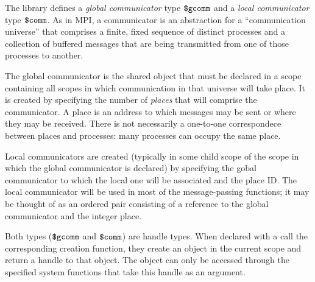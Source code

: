 The library defines a \emph{global communicator} type $\mbox{\texttt{\${}gcomm}}$ and a
\emph{local communicator} type $\mbox{\texttt{\${}comm}}$. As in MPI, a communicator is
an abstraction for a ``communication universe'' that comprises a
finite, fixed sequence of distinct processes and a collection of
buffered messages that are being transmitted from one of those
processes to another.

The global communicator is the shared object that must be declared in
a scope containing all scopes in which communication in that universe
will take place. It is created by specifying the number of
\emph{places} that will comprise the communicator. A place is an
address to which messages may be sent or where they may be received.
There is not necessarily a one-to-one correspondece between places and
processes: many processes can occupy the same place.

Local communicators are created (typically in some child scope of the
scope in which the global communicator is declared) by specifying the
gobal communicator to which the local one will be associated and the
place ID. The local communicator will be used in most of the
message-passing functions; it may be thought of as an ordered pair
consisting of a reference to the global communicator and the integer
place.

Both types ($\mbox{\texttt{\${}gcomm}}$ and $\mbox{\texttt{\${}comm}}$) are handle types. When declared
with a call the corresponding creation function, they create an object
in the current scope and return a handle to that object. The object
can only be accessed through the specified system functions that take
this handle as an argument.

